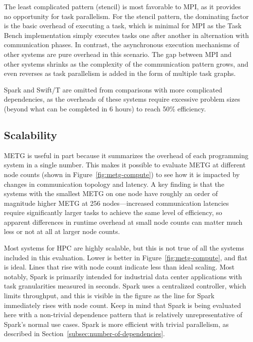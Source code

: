 The least complicated pattern (stencil) is most favorable
to MPI, as it provides no
opportunity for task parallelism. For the stencil pattern, the
dominating factor is the basic overhead of executing a task, which is
minimal for MPI as the Task Bench implementation simply executes tasks one after another in alternation with
communication phases. In contrast, the asynchronous execution
mechanisms of other systems are pure overhead in this scenario.
The gap between MPI and other systems shrinks as the complexity of the
communication pattern grows, and even reverses as task parallelism is
added in the form of multiple task graphs.

Spark and Swift/T
are omitted from comparisons with more complicated dependencies, as the overheads of these systems require
excessive problem sizes (beyond what can be completed in 6
hours) to reach 50\% efficiency.

\subsection{Scalability}
\label{subsec:scalability}

METG is useful in part because it summarizes the overhead of each programming system in a single number. This makes it
possible to evaluate METG at different node counts (shown in
Figure~\ref{fig:metg-compute}) to see how it is impacted by changes in
communication topology and latency. A key finding is that
the systems with the smallest METG on one node have roughly an order
of magnitude higher METG at 256 nodes---increased communication latencies require significantly larger tasks to
achieve the same level of efficiency, so apparent differences in
runtime overhead at small node counts can matter much less or not at
all at larger node counts.

Most systems for HPC are highly scalable,
but this is not true of all the systems included in this
evaluation. Lower is better in Figure~\ref{fig:metg-compute}, and
flat is ideal. Lines that rise with node count indicate less than
ideal scaling. Most notably, Spark is primarily
intended for industrial data center applications with task
granularities measured in seconds. Spark uses a centralized
controller, which limits throughput, and this is visible in the figure
as the line for Spark immediately rises with node count. Keep in mind
that Spark is being evaluated here with a non-trivial dependence
pattern that is relatively unrepresentative of Spark's normal use
cases. Spark is more efficient with trivial parallelism, as described
in Section~\ref{subsec:number-of-dependencies}.

